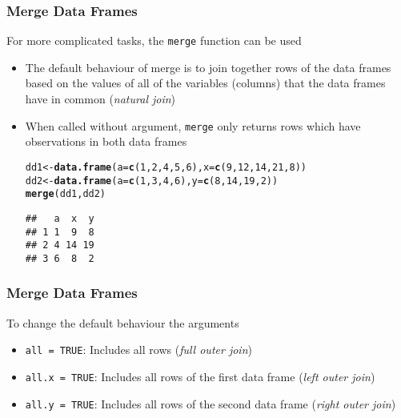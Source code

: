 \documentclass[paper=screen,mathserif]{beamer}\usepackage[]{graphicx}\usepackage[]{color}
\makeatletter
\newcommand{\hlnum}[1]{\textcolor[rgb]{0.686,0.059,0.569}{#1}}%
\newcommand{\hlstd}[1]{\textcolor[rgb]{0.345,0.345,0.345}{#1}}%
\newcommand{\hlkwb}[1]{\textcolor[rgb]{0.69,0.353,0.396}{#1}}%
\newcommand{\hlkwc}[1]{\textcolor[rgb]{0.333,0.667,0.333}{#1}}%
\newcommand{\hlkwd}[1]{\textcolor[rgb]{0.737,0.353,0.396}{\textbf{#1}}}%
\newenvironment{kframe}{%
 \def\at@end@of@kframe{}%
 \ifinner\ifhmode%
  \def\at@end@of@kframe{\end{minipage}}%
  \begin{minipage}{\columnwidth}%
 \fi\fi%
 \def\FrameCommand##1{\hskip\@totalleftmargin \hskip-\fboxsep
 \colorbox{shadecolor}{##1}\hskip-\fboxsep
     \hskip-\linewidth \hskip-\@totalleftmargin \hskip\columnwidth}%
 \MakeFramed {\advance\hsize-\width
   \@totalleftmargin\z@ \linewidth\hsize
   \@setminipage}}%
 {\par\unskip\endMakeFramed%
 \at@end@of@kframe}
\newenvironment{knitrout}{}{} %
\newcommand{\ft}[1]{\frametitle{#1}}
\makeatother
\begin{document}
\begin{frame}[fragile]
  \ft{Merge Data Frames}
  
  For more complicated tasks, the \verb=merge= function can be used
  \begin{itemize}
  \item The default behaviour of merge is to join together rows of the
    data frames based on the values of all of the variables (columns)
    that the data frames have in common ({\em natural join})
  \item When called without argument, \verb=merge= only returns rows
    which have observations in both data frames
\begin{knitrout}\scriptsize
{}\color{fgcolor}\begin{kframe}
\begin{alltt}
\hlstd{dd1} \hlkwb{<-} \hlkwd{data.frame}\hlstd{(}\hlkwc{a} \hlstd{=} \hlkwd{c}\hlstd{(}\hlnum{1}\hlstd{,}\hlnum{2}\hlstd{,}\hlnum{4}\hlstd{,}\hlnum{5}\hlstd{,}\hlnum{6}\hlstd{),} \hlkwc{x} \hlstd{=} \hlkwd{c}\hlstd{(}\hlnum{9}\hlstd{,}\hlnum{12}\hlstd{,}\hlnum{14}\hlstd{,}\hlnum{21}\hlstd{,}\hlnum{8}\hlstd{))}
\hlstd{dd2} \hlkwb{<-} \hlkwd{data.frame}\hlstd{(}\hlkwc{a}\hlstd{=}\hlkwd{c}\hlstd{(}\hlnum{1}\hlstd{,}\hlnum{3}\hlstd{,}\hlnum{4}\hlstd{,}\hlnum{6}\hlstd{),}\hlkwc{y}\hlstd{=}\hlkwd{c}\hlstd{(}\hlnum{8}\hlstd{,}\hlnum{14}\hlstd{,}\hlnum{19}\hlstd{,}\hlnum{2}\hlstd{))}
\hlkwd{merge}\hlstd{(dd1, dd2)}
\end{alltt}
\begin{verbatim}
##   a  x  y
## 1 1  9  8
## 2 4 14 19
## 3 6  8  2
\end{verbatim}
\end{kframe}
\end{knitrout}
  \end{itemize}
\end{frame}

\begin{frame}[fragile]
  \ft{Merge Data Frames}
  
  To change the default behaviour the arguments
  \begin{itemize}
  \item \verb|all = TRUE|: Includes all rows ({\em full outer join})
  \item \verb|all.x = TRUE|: Includes all rows of the first data frame
    ({\em left outer join})
  \item \verb|all.y = TRUE|: Includes all rows of the second data frame
    ({\em right outer join})
  \end{itemize}

\end{frame}
\end{document}

